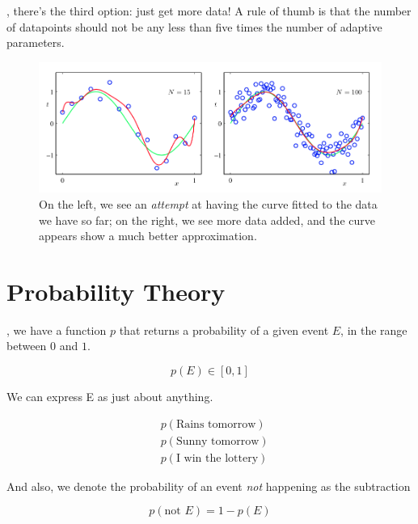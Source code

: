 \documentclass{tufte-handout}
\begin{document}
\break

, there's the third option: just get more data! A rule of
thumb is that the number of datapoints should not be any less than five times
the number of adaptive parameters.

\begin{figure}[h]
  \includegraphics[width=\linewidth]{moredata.png}%
  \caption{On the left, we see an \emph{attempt} at having the curve fitted to
  the data we have so far; on the right, we see more data added, and the curve
  appears show a much better approximation.}
\end{figure}

\break

\section{Probability Theory}

, we have a function $p$ that returns a probability
of a given event $E$, in the range between $0$ and $1$.

\begin{equation}
  p(E) \in [0, 1]
\end{equation}

We can express E as just about anything.

\begin{align}
  & p(\text{Rains tomorrow}) \\
  & p(\text{Sunny tomorrow}) \\
  & p(\text{I win the lottery})
\end{align}

And also, we denote the probability of an event \emph{not} happening as the
subtraction

\begin{equation} \label{equation:probabilitynot}
  p(\text{not } E) = 1 - p(E)
\end{equation}
\end{document}
